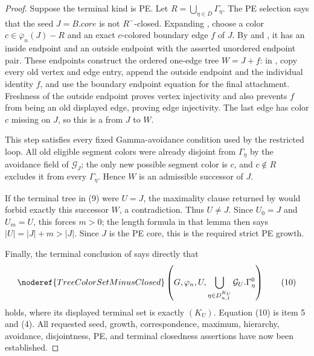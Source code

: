 \begin{proof}
Suppose the terminal kind is PE.  Let
$R=\bigcup_{\eta\in D}\Gamma_\eta$.  The PE selection says that the seed
$J=B.\mathit{core}$ is not $R^-$-closed.  Expanding
, choose a color
$c\in\overline\varphi_n(J)-R$ and an exact $c$-colored boundary edge $f$
of $J$.  By  and , it
has an inside endpoint and an outside endpoint with the asserted unordered
endpoint pair.  These endpoints construct the ordered one-edge tree
$W=J+f$: in , copy every old vertex and edge entry,
append the outside endpoint and the individual identity $f$, and use the
boundary endpoint equation for the final attachment.  Freshness of the
outside endpoint proves vertex injectivity and also prevents $f$ from
being an old displayed edge, proving edge injectivity.  The last edge has color $c$
missing on $J$, so this is a
 from $J$ to $W$.

This step satisfies every fixed Gamma-avoidance condition used by the
restricted loop.  All old eligible segment colors were already disjoint
from $\Gamma_\eta$ by the avoidance field of $\mathcal G_J$; the only new
possible segment color is $c$, and $c\notin R$ excludes it from every
$\Gamma_\eta$.  Hence $W$ is an admissible successor of $J$.

If the terminal tree in (9) were $U=J$, the maximality clause returned by
 would forbid exactly this
successor $W$, a contradiction.  Thus $U\ne J$.  Since $U_0=J$ and
$U_m=U$, this forces $m>0$; the length formula in that lemma then says
$|U|=|J|+m>|J|$.  Since $J$ is the PE core, this is the required strict PE
growth.

Finally, the terminal conclusion of
 says directly that
\[
 \noderef{TreeColorSetMinusClosed}\left(
   G,\varphi_n,U,
   \bigcup_{\eta\in D^{K_U}_{n,1}}
     \mathcal G_U.\Gamma^0_\eta\right)                         \tag{10}
\]
holds, where its displayed terminal set is exactly
$(K_U)$.  Equation (10) is item 5
and (4).  All requested seed, growth, correspondence, maximum, hierarchy,
avoidance, disjointness, PE, and terminal closedness assertions have now
been established.
\end{proof}
